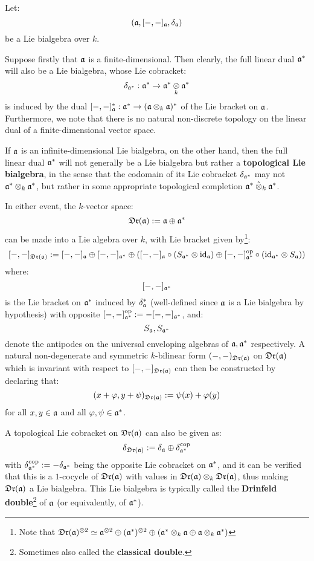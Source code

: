         \begin{remark} \label{remark: drinfeld_doubles}
            Let:
                $$(\mathfrak{a}, [-, -]_{\mathfrak{a}}, \delta_{\mathfrak{a}})$$
            be a Lie bialgebra over $k$.
        
            Suppose firstly that $\mathfrak{a}$ is a finite-dimensional. Then clearly, the full linear dual $\mathfrak{a}^*$ will also be a Lie bialgebra, whose Lie cobracket:
                $$\delta_{\a^*}: \a^* \to \a^* \tensor_k \a^*$$
            is induced by the dual $[-, -]_{\a}^*: \a^* \to (\a \tensor_k \a)^*$ of the Lie bracket on $\mathfrak{a}$. Furthermore, we note that there is no natural non-discrete topology on the linear dual of a finite-dimensional vector space.

            If $\mathfrak{a}$ is an infinite-dimensional Lie bialgebra, on the other hand, then the full linear dual $\mathfrak{a}^*$ will not generally be a Lie bialgebra but rather a \textbf{topological Lie bialgebra}, in the sense that the codomain of its Lie cobracket $\delta_{\mathfrak{a}^*}$ may not $\a^* \tensor_k \a^*$, but rather in some appropriate topological completion $\a^* \hattensor_k \a^*$.

            In either event, the $k$-vector space:
                $$\mathfrak{Dr}(\mathfrak{a}) := \mathfrak{a} \oplus \mathfrak{a}^*$$
            can be made into a Lie algebra over $k$, with Lie bracket given by\footnote{Note that $\frakDr(\a)^{\tensor 2} \cong \a^{\tensor 2} \oplus (\a^*)^{\tensor 2} \oplus (\a^* \tensor_k \a \oplus \a \tensor_k \a^*)$}:
                $$[-, -]_{\frakDr(\a)} := [-, -]_{\a} \oplus [-, -]_{\a^*} \oplus ( [-, -]_{\a} \circ (S_{\a^*} \tensor \id_{\a}) \oplus [-, -]_{\a^*}^{\op} \circ (\id_{\a^*} \tensor S_{\a}) )$$
            where:
                $$[-, -]_{\mathfrak{a}^*}$$
            is the Lie bracket on $\mathfrak{a}^*$ induced by $\delta_{\mathfrak{a}}^*$ (well-defined since $\mathfrak{a}$ is a Lie bialgebra by hypothesis) with opposite $[-, -]_{\mathfrak{a}^*}^{\mathrm{op}} := -[-, -]_{\mathfrak{a}^*}$, and:
                $$S_{\mathfrak{a}}, S_{\mathfrak{a}^*}$$
            denote the antipodes on the universal enveloping algebras of $\mathfrak{a}, \mathfrak{a}^*$ respectively. A natural non-degenerate and symmetric $k$-bilinear form $(-, -)_{\mathfrak{Dr}(\mathfrak{a})}$ on $\mathfrak{Dr}(\mathfrak{a})$ which is invariant with respect to $[-, -]_{\mathfrak{Dr}(\mathfrak{a})}$ can then be constructed by declaring that:
                $$(x + \varphi, y + \psi)_{\mathfrak{Dr}(\mathfrak{a})} := \psi(x) + \varphi(y)$$
            for all $x, y \in \mathfrak{a}$ and all $\varphi, \psi \in \mathfrak{a}^*$. 

            A topological Lie cobracket on $\mathfrak{Dr}(\mathfrak{a})$ can also be given as:
                $$\delta_{\mathfrak{Dr}(\mathfrak{a})} := \delta_{\mathfrak{a}} \oplus \delta_{\mathfrak{a}^*}^{\mathrm{cop}}$$
            with $\delta_{\mathfrak{a}^*}^{\mathrm{cop}} := -\delta_{\mathfrak{a}^*}$ being the opposite Lie cobracket on $\mathfrak{a}^*$, and it can be verified that this is a $1$-cocycle of $\mathfrak{Dr}(\mathfrak{a})$ with values in $\frakDr(\a) \tensor_k \frakDr(\a)$, thus making $\mathfrak{Dr}(\mathfrak{a})$ a Lie bialgebra. This Lie bialgebra is typically called the \textbf{Drinfeld double}\footnote{Sometimes also called the \textbf{classical double}.} of $\mathfrak{a}$ (or equivalently, of $\mathfrak{a}^*$).
        \end{remark}
